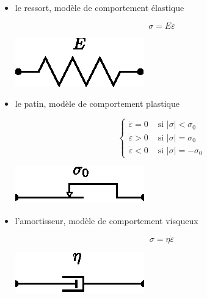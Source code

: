 \begin{itemize}
    \item le ressort, modèle de comportement élastique
        \begin{multicols}{2}
            \begin{equation}
                \sigma = E \varepsilon
                \label{eq:Ch04-039}
            \end{equation}
            \columnbreak
            \begin{center}
                \includegraphics{../images/T1_Ch04-0022}
            \end{center}
        \end{multicols}
    \item le patin, modèle de comportement plastique
        \begin{multicols}{2}
            \begin{equation}
                \begin{cases}
                    \dot\varepsilon = 0 & \text{ si } |\sigma|<\sigma_0 \\
                    \dot\varepsilon > 0 & \text{ si } |\sigma|=\sigma_0 \\
                    \dot\varepsilon < 0 & \text{ si } |\sigma|=-\sigma_0
                \end{cases}
                \label{eq:Ch04-040}
            \end{equation}
            \columnbreak
            \begin{center}
                \includegraphics{../images/T1_Ch04-0023}
            \end{center}
        \end{multicols}
    \item l'amortisseur, modèle de comportement visqueux
        \begin{multicols}{2}
            \begin{equation}
                \sigma = \eta \dot \varepsilon
                \label{eq:Ch04-041}
            \end{equation}
            \columnbreak
            \begin{center}
                \includegraphics{../images/T1_Ch04-0024}
            \end{center}
        \end{multicols}
\end{itemize}
